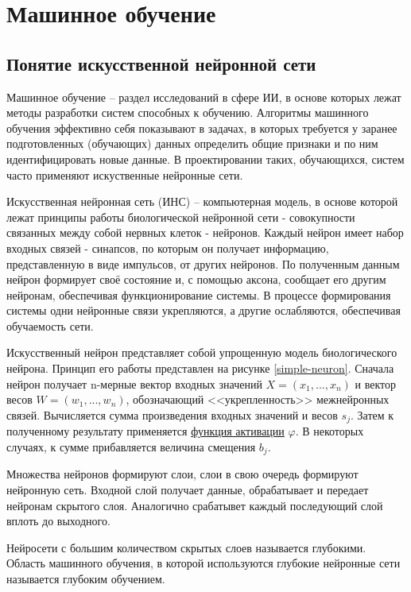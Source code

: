 \section{Машинное обучение} \label{ML}

\subsection{Понятие искусственной нейронной сети}

Машинное обучение – раздел исследований в сфере ИИ, в основе которых лежат методы разработки систем способных к обучению. Алгоритмы машинного обучения эффективно себя показывают в задачах, в которых требуется у заранее подготовленных (обучающих) данных определить общие признаки и по ним идентифицировать новые данные. В проектировании таких, обучающихся, систем часто применяют искуственные нейронные сети. 

Искусственная нейронная сеть (ИНС) – компьютерная модель, в основе которой лежат принципы работы биологической нейронной сети - совокупности связанных между собой нервных клеток - нейронов. Каждый нейрон имеет набор входных связей - синапсов, по которым он получает информацию, представленную в виде импульсов, от других нейронов. По полученным данным нейрон формирует своё состояние и, с помощью аксона, сообщает его другим нейронам, обеспечивая функционирование системы. В процессе формирования системы одни нейронные связи укрепляются, а другие ослабляются, обеспечивая обучаемость сети.

Искусственный нейрон представляет собой упрощенную модель биологического нейрона. Принцип его работы представлен на рисунке \ref{simple-neuron}. Сначала нейрон получает n-мерные вектор входных значений $X=(x_{1},...,x_{n})$ и вектор весов $W=(w_{1},...,w_{n})$, обозначающий <<укрепленность>> межнейронных связей. Вычисляется сумма произведения входных значений и весов $s_j$. Затем к полученному результату применяется \hyperref[sec:activation]{функция активации} $\varphi$. В некоторых случаях, к сумме прибавляется величина смещения $b_j$.


Множества нейронов формируют слои, слои в свою очередь формируют нейронную сеть. Входной слой получает данные, обрабатывает и передает нейронам скрытого слоя. Аналогично срабатывет каждый последующий слой вплоть до выходного. 


Нейросети с большим количеством скрытых слоев называется глубокими. Область машинного обучения, в которой используются глубокие нейронные сети называется глубоким обучением.     

